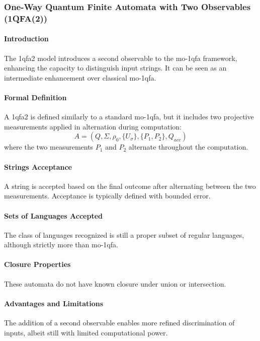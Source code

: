 \subsubsection{One-Way Quantum Finite Automata with Two Observables (1QFA(2))}
\paragraph{Introduction}
The \gls{1qfa2} model introduces a second observable to the \gls{mo-1qfa} framework, enhancing the capacity to distinguish input strings. It can be seen as an intermediate enhancement over classical \gls{mo-1qfa}.

\paragraph{Formal Definition}
A \gls{1qfa2} is defined similarly to a standard \gls{mo-1qfa}, but it includes two projective measurements applied in alternation during computation:
\[
A = (Q, \Sigma, \rho_0, \{U_{\sigma}\}, \{P_1, P_2\}, Q_{acc})
\]
where the two measurements \( P_1 \) and \( P_2 \) alternate throughout the computation.

\paragraph{Strings Acceptance}
A string is accepted based on the final outcome after alternating between the two measurements. Acceptance is typically defined with bounded error.

\paragraph{Sets of Languages Accepted}
The class of languages recognized is still a proper subset of regular languages, although strictly more than \gls{mo-1qfa}.

\paragraph{Closure Properties}
These automata do not have known closure under union or intersection.

\paragraph{Advantages and Limitations}
The addition of a second observable enables more refined discrimination of inputs, albeit still with limited computational power.

